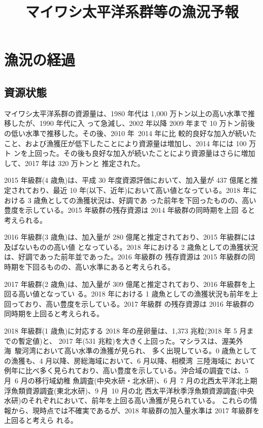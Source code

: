 \documentclass[11pt]{article}
\author{}
\date{}
\title{マイワシ太平洋系群等の漁況予報}
\begin{document}
\maketitle

\section{漁況の経過}
\subsection{資源状態}
マイワシ太平洋系群の資源量は、1980 年代は 1,000 万トン以上の高い水準で推移したが、1990 年代に入
って急減し、2002 年以降 2009 年まで 10 万トン前後の低い水準で推移した。その後、2010 年~2014 年に比 較的良好な加入が続いたこと、および漁獲圧が低下したことにより資源量は増加し、2014 年には 100 万ト ンを上回った。その後も良好な加入が続いたことにより資源量はさらに増加して、2017 年は 320 万トンと 推定された。

2015 年級群(4 歳魚)は、平成 30 年度資源評価において、加入量が 437 億尾と推定されており、最近 10 年(以下、近年)において高い値となっている。2018 年における 3 歳魚としての漁獲状況は、好調であ った前年を下回ったものの、高い豊度を示している。2015 年級群の残存資源は 2014 年級群の同時期を上回 ると考えられる。

2016 年級群(3 歳魚)は、加入量が 280 億尾と推定されており、2015 年級群には及ばないものの高い値 となっている。2018 年における 2 歳魚としての漁獲状況は、好調であった前年並であった。2016 年級群の
残存資源は 2015 年級群の同時期を下回るものの、高い水準にあると考えられる。

2017 年級群(2 歳魚)は、加入量が 309 億尾と推定されており、2016 年級群を上回る高い値となってい る。2018 年における 1 歳魚としての漁獲状況も前年を上回っており、高い豊度を示している。2017 年級群
の残存資源は 2016 年級群の同時期を上回ると考えられる。

2018 年級群(1 歳魚)に対応する 2018 年の産卵量は、1,373 兆粒(2018 年 5 月までの暫定値)と、
2017 年(531 兆粒)を大きく上回った。マシラスは、渥美外海~駿河湾において高い水準の漁獲が見られ、 多く出現している。0 歳魚としての漁獲も、4 月以降、房総海域において、6 月以降、相模湾~三陸海域に おいて例年に比べ多く見られており、高い豊度を示している。沖合域の調査では、5 月~6 月の移行域幼稚 魚調査(中央水研・北水研)、6 月~7 月の北西太平洋北上期浮魚類資源調査(東北水研)、9 月~10 月の北 西太平洋秋季浮魚類資源調査(中央水研)のそれぞれにおいて、前年を上回る高い漁獲が見られている。 これらの情報から、現時点では不確実であるが、2018 年級群の加入量水準は 2017 年級群を上回ると考えら れる。
\end{document}
